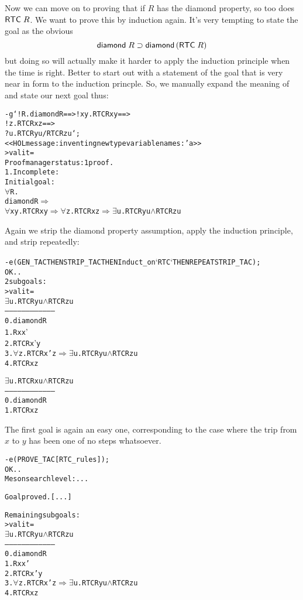 Now we can move on to proving that if $R$ has the diamond property, so
too does ${\sf RTC}\;R$.  We want to prove this by induction again.
It's very tempting to state the goal as the obvious \[
{\sf diamond}\;R\supset{\sf diamond}\,({\sf RTC}\;R)
\] but doing so will actually make it harder to apply the induction
principle when the time is right.  Better to start out with a
statement of the goal that is very near in form to the induction
princple.  So, we manually expand the meaning of  and state
our next goal thus:
\begin{session}
\begin{alltt}
- g `!R. diamond R ==> !x y. RTC R x y ==>
                             !z. RTC R x z ==>
                                 ?u. RTC R y u /\bs RTC R z u`;
<<HOL message: inventing new type variable names: 'a>>
> val it =
    Proof manager status: 1 proof.
    1. Incomplete:
         Initial goal:
         \(\forall\)R.
           diamond R \(\Rightarrow\)
           \(\forall\)x y. RTC R x y \(\Rightarrow\) \(\forall\)z. RTC R x z \(\Rightarrow\) \(\exists\)u. RTC R y u \(\land\) RTC R z u
\end{alltt}
\end{session}
    Again we strip the diamond property assumption, apply the
    induction principle, and strip repeatedly:
\begin{session}
\begin{alltt}
- e (GEN_TAC THEN STRIP_TAC THEN Induct_on `RTC` THEN REPEAT STRIP_TAC);
OK..
2 subgoals:
> val it =
    \(\exists\)u. RTC R y u \(\land\) RTC R z u
    ------------------------------------
      0.  diamond R
      1.  R x x'
      2.  RTC R x' y
      3.  \(\forall\)z. RTC R x' z \(\Rightarrow\) \(\exists\)u. RTC R y u \(\land\) RTC R z u
      4.  RTC R x z

    \(\exists\)u. RTC R x u \(\land\) RTC R z u
    ------------------------------------
      0.  diamond R
      1.  RTC R x z
\end{alltt}
\end{session}
The first goal is again an easy one, corresponding to the case where
the trip from $x$ to $y$ has been one of no steps whatsoever.
\begin{session}
\begin{alltt}
- e (PROVE_TAC [RTC_rules]);
OK..
Meson search level: ...

Goal proved. [...]

Remaining subgoals:
> val it =
    \(\exists\)u. RTC R y u \(\land\) RTC R z u
    ------------------------------------
      0.  diamond R
      1.  R x x'
      2.  RTC R x' y
      3.  \(\forall\)z. RTC R x' z \(\Rightarrow\) \(\exists\)u. RTC R y u \(\land\) RTC R z u
      4.  RTC R x z
\end{alltt}
\end{session}
